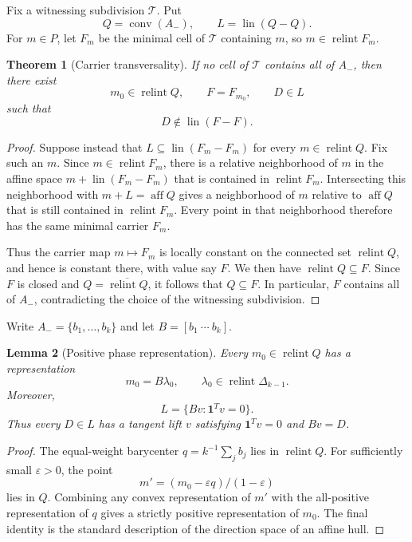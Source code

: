 \documentclass[11pt]{article}
\theoremstyle{plain}
\newtheorem{theorem}{Theorem}[section]
\newtheorem{lemma}[theorem]{Lemma}
\theoremstyle{definition}
\theoremstyle{remark}
\newcommand{\conv}{\operatorname{conv}}
\newcommand{\relint}{\operatorname{relint}}
\newcommand{\lin}{\operatorname{lin}}
\newcommand{\aff}{\operatorname{aff}}
\newcommand{\one}{\mathbf 1}
\begin{document}
Fix a witnessing subdivision $\mathcal T$. Put
\[
 Q=\conv(A_-),\qquad L=\lin(Q-Q).
\]
For $m\in P$, let $F_m$ be the minimal cell of $\mathcal T$ containing $m$, so $m\in\relint F_m$.

\begin{theorem}[Carrier transversality]\label{thm:carrier}
If no cell of $\mathcal T$ contains all of $A_-$, then there exist
\[
 m_0\in\relint Q,\qquad F=F_{m_0},\qquad D\in L
\]
such that
\[
 D\notin\lin(F-F).
\]
\end{theorem}

\begin{proof}
Suppose instead that $L\subseteq\lin(F_m-F_m)$ for every $m\in\relint Q$. Fix such an $m$. Since $m\in\relint F_m$, there is a relative neighborhood of $m$ in the affine space $m+\lin(F_m-F_m)$ that is contained in $\relint F_m$. Intersecting this neighborhood with $m+L=\aff Q$ gives a neighborhood of $m$ relative to $\aff Q$ that is still contained in $\relint F_m$. Every point in that neighborhood therefore has the same minimal carrier $F_m$.

Thus the carrier map $m\mapsto F_m$ is locally constant on the connected set $\relint Q$, and hence is constant there, with value say $F$. We then have $\relint Q\subseteq F$. Since $F$ is closed and $Q=\overline{\relint Q}$, it follows that $Q\subseteq F$. In particular, $F$ contains all of $A_-$, contradicting the choice of the witnessing subdivision.
\end{proof}

Write $A_-=\{b_1,\ldots,b_k\}$ and let $B=[b_1\ \cdots\ b_k]$.

\begin{lemma}[Positive phase representation]\label{lem:positive-phase}
Every $m_0\in\relint Q$ has a representation
\[
 m_0=B\lambda_0,\qquad \lambda_0\in\relint\Delta_{k-1}.
\]
Moreover,
\[
 L=\{Bv:\one^Tv=0\}.
\]
Thus every $D\in L$ has a tangent lift $v$ satisfying $\one^Tv=0$ and $Bv=D$.
\end{lemma}

\begin{proof}
The equal-weight barycenter $q=k^{-1}\sum_jb_j$ lies in $\relint Q$. For sufficiently small $\varepsilon>0$, the point
\[
 m'=(m_0-\varepsilon q)/(1-\varepsilon)
\]
lies in $Q$. Combining any convex representation of $m'$ with the all-positive representation of $q$ gives a strictly positive representation of $m_0$. The final identity is the standard description of the direction space of an affine hull.
\end{proof}
\end{document}
